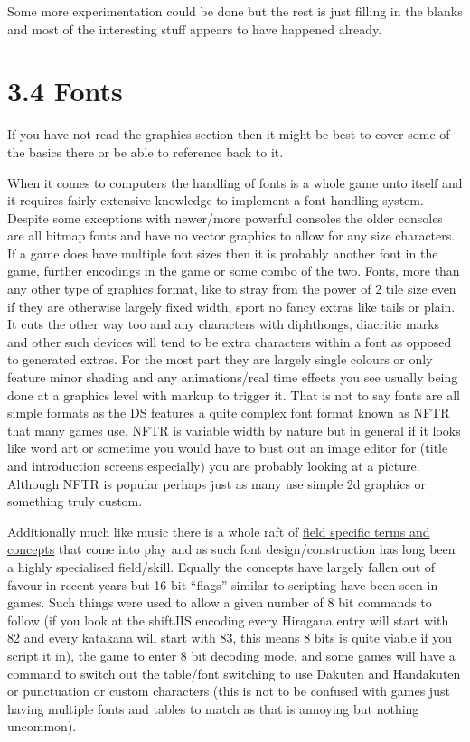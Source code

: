 \documentclass[
]{book}
\begin{document}
Some more experimentation could be done but the rest is just filling in the blanks and most of the interesting stuff appears to have happened already.

\hypertarget{fonts}{%
\section{3.4 Fonts}\label{fonts}}

If you have not read the graphics section then it might be best to cover some of the basics there or be able to reference back to it.

When it comes to computers the handling of fonts is a whole game unto itself and it requires fairly extensive knowledge to implement a font handling system. Despite some exceptions with newer/more powerful consoles the older consoles are all bitmap fonts and have no vector graphics to allow for any size characters. If a game does have multiple font sizes then it is probably another font in the game, further encodings in the game or some combo of the two. Fonts, more than any other type of graphics format, like to stray from the power of 2 tile size even if they are otherwise largely fixed width, sport no fancy extras like tails or plain. It cuts the other way too and any characters with diphthongs, diacritic marks and other such devices will tend to be extra characters within a font as opposed to generated extras. For the most part they are largely single colours or only feature minor shading and any animations/real time effects you see usually being done at a graphics level with markup to trigger it. That is not to say fonts are all simple formats as the DS features a quite complex font format known as NFTR that many games use. NFTR is variable width by nature but in general if it looks like word art or sometime you would have to bust out an image editor for (title and introduction screens especially) you are probably looking at a picture. Although NFTR is popular perhaps just as many use simple 2d graphics or something truly custom.

Additionally much like music there is a whole raft of \href{http://www.fontshop.com/glossary/}{field specific terms and concepts} that come into play and as such font design/construction has long been a highly specialised field/skill. Equally the concepts have largely fallen out of favour in recent years but 16 bit ``flags'' similar to scripting have been seen in games. Such things were used to allow a given number of 8 bit commands to follow (if you look at the shiftJIS encoding every Hiragana entry will start with 82 and every katakana will start with 83, this means 8 bits is quite viable if you script it in), the game to enter 8 bit decoding mode, and some games will have a command to switch out the table/font switching to use Dakuten and Handakuten or punctuation or custom characters (this is not to be confused with games just having multiple fonts and tables to match as that is annoying but nothing uncommon).
\end{document}
